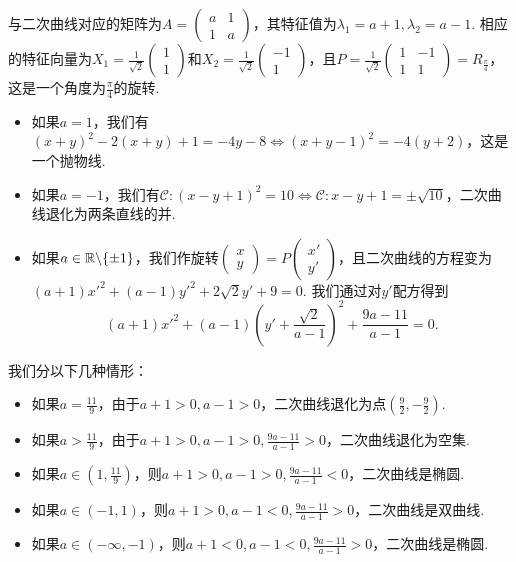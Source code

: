 \begin{solution}
  \begin{inparaenum}[(1)]\setcounter{enumi}{1}
    \item 与二次曲线对应的矩阵为$A=\begin{pmatrix}
      a & 1 \\
      1 & a
    \end{pmatrix}$，其特征值为$\lambda_1=a+1,\lambda_2=a-1$. 相应的特征向量为$X_1=\frac1{\sqrt2}\begin{pmatrix}
      1 \\
      1
    \end{pmatrix}$和$X_2=\frac1{\sqrt2}\begin{pmatrix}
      -1 \\
      1
    \end{pmatrix}$，且$P=\frac1{\sqrt2}\begin{pmatrix}
      1 & -1\\
      1 & 1
    \end{pmatrix}=R_{\frac\pi4}$，这是一个角度为$\frac\pi4$的旋转.
  \end{inparaenum}
  \begin{itemize}
    \item 如果$a=1$，我们有$(x+y)^2-2(x+y)+1=-4y-8\Leftrightarrow
        (x+y-1)^2=-4(y+2)$，这是一个抛物线.
    \item 如果$a=-1$，我们有$\mathscr C:(x-y+1)^2=10\Leftrightarrow \mathscr C:x-y+1=\pm\sqrt{10}$，二次曲线退化为两条直线的并.
    \item 如果$a\in\mathbb R\backslash\{\pm1\}$，我们作旋转$\begin{pmatrix}
          x \\
          y
        \end{pmatrix}=P\begin{pmatrix}
          x' \\
          y'
        \end{pmatrix}$，且二次曲线的方程变为$(a+1)x'^2+(a-1)y'^2+2\sqrt2y'+9=0$. 我们通过对$y'$配方得到
        \[
          (a + 1)x'^2 + (a - 1)\left( y' + \frac{\sqrt2}{a-1} \right)^2 + \frac{9a-11}{a-1} = 0.
        \]
    \end{itemize}

  我们分以下几种情形：
  \begin{itemize}
    \item 如果$a=\frac{11}9$，由于$a+1>0,a-1>0$，二次曲线退化为点$\left(\frac92,-\frac92\right)$.
    \item 如果$a>\frac{11}9$，由于$a+1>0,a-1>0,\frac{9a-11}{a-1}>0$，二次曲线退化为空集.
    \item 如果$a\in\left(1,\frac{11}9\right)$，则$a+1>0,a-1>0,\frac{9a-11}{a-1}<0$，二次曲线是椭圆.
    \item 如果$a\in(-1,1)$，则$ a+1>0,a-1<0,\frac{9a-11}{a-1}>0$，二次曲线是双曲线.
    \item 如果$a\in(-\infty,-1)$，则$ a+1<0,a-1<0,\frac{9a-11}{a-1}>0$，二次曲线是椭圆.
  \end{itemize}


\end{solution}
